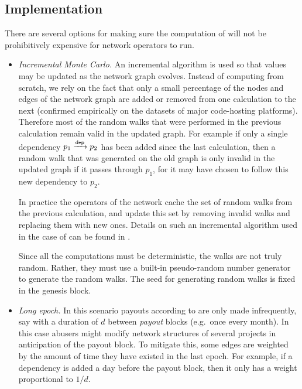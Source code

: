 \subsection{Implementation}

There are several options for making sure the computation of \osrank{}
will not be prohibitively expensive for network operators to run.

\begin{itemize}
\item \emph{Incremental Monte Carlo.} An incremental algorithm is used so that
  \osrank{} values may be updated as the network graph evolves. Instead of
  computing \osrank{} from scratch, we rely on the fact that only a small
  percentage of the nodes and edges of the network graph are added or removed
  from one calculation to the next (confirmed empirically on the datasets of
  major code-hosting platforms). Therefore most of the random walks that were
  performed in the previous calculation remain valid in the updated graph. For
  example if only a single dependency $p_1 \xrightarrow[]{\mathsf{dep}} p_2$ has been
  added since the last calculation, then a random walk that was generated on the
  old graph is only invalid in the updated graph if it passes through $p_1$, for
  it may have chosen to follow this new dependency to $p_2$.

  In practice the operators of the network cache the set of random
  walks from the previous calculation, and update this set by removing
  invalid walks and replacing them with new ones. Details on such an
  incremental algorithm used in the case of \pagerank{} can be found
  in \cite{incr pagerank}.

  Since all the computations must be deterministic, the walks are not
  truly random. Rather, they must use a built-in pseudo-random number
  generator to generate the random walks. The seed for generating
  random walks is fixed in the genesis block.


\item \emph{Long epoch.} In this scenario payouts according to
  \osrank{} are only made infrequently, say with a duration of $d$
  between \emph{payout} blocks (e.g.\ once every month). In this case
  abusers might modify network structures of several projects in
  anticipation of the payout block. To mitigate this, some edges are
  weighted by the amount of time they have existed in the last epoch. For
  example, if a dependency is added a day before the payout block,
  then it only has a weight proportional to $1/d$.
\end{itemize}

